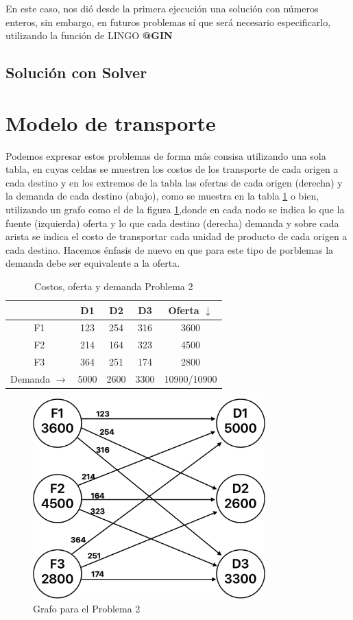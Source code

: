 \documentclass[12pt]{article}  %
\begin{document}
En este caso, nos dió desde la primera ejecución una solución con números enteros, sin embargo, en futuros problemas sí que será necesario especificarlo, utilizando la función de LINGO \textbf{@GIN}

\subsection{Solución con Solver}

\section{Modelo de transporte}
Podemos expresar estos problemas de forma más consisa utilizando una sola tabla, en cuyas celdas se muestren los costos de los transporte de cada origen a cada destino y en los extremos de la tabla las ofertas de cada origen (derecha) y la demanda de cada destino (abajo), como se muestra en la tabla \ref{tab:prob2} o bien, utilizando un grafo como el de la figura \ref{fig:grafProb2},donde en cada nodo se indica lo que la fuente (izquierda) oferta y lo que cada destino (derecha) demanda y sobre cada arista se indica el costo de transportar cada unidad de producto de cada origen a cada destino. Hacemos énfasis de nuevo en que para este tipo de porblemas la demanda debe ser equivalente a la oferta.

\begin{table}[H]
\centering
\caption{Costos, oferta y demanda Problema 2}
\label{tab:prob2}
\begin{tabular}{c|ccc|c}
& D1 & D2 & D3 & Oferta $\downarrow$ \\
\hline
F1 & 123 & 254 & 316 & 3600 \\
F2 & 214 & 164 & 323 & 4500 \\
F3 & 364 & 251 & 174 & 2800 \\
\hline
Demanda $\rightarrow$ & 5000 & 2600 & 3300 & 10900/10900
\end{tabular}
\end{table}

\begin{figure}[h]
    \centering
    \caption{Grafo para el Problema 2}
    \label{fig:grafProb2}
    \includegraphics[width=0.8\textwidth]{assets/grafoProb2.png}
\end{figure}
\end{document}
